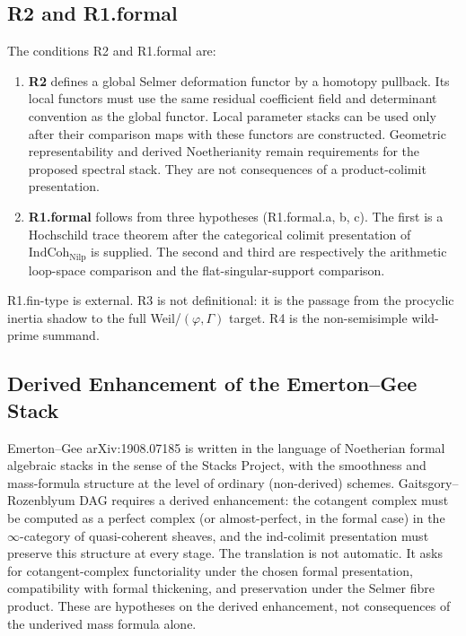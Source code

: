 \subsection{R2 and R1.formal}

The conditions R2 and R1.formal are:
\begin{enumerate}
\item \textbf{R2} defines a global Selmer deformation functor
by a homotopy pullback. Its local functors must use the same residual
coefficient field and determinant convention as the global functor.
Local parameter stacks can be used only after their comparison maps
with these functors are constructed. Geometric representability and
derived Noetherianity remain requirements for the proposed spectral
stack. They are not consequences of a product-colimit presentation.
\item \textbf{R1.formal} follows from three hypotheses
(R1.formal.a, b, c). The first is a Hochschild trace theorem after
the categorical colimit presentation of
\(\mathrm{IndCoh}_{\mathrm{Nilp}}\) is supplied. The second and third
are respectively the arithmetic loop-space comparison and the
flat-singular-support comparison.
\end{enumerate}

R1.fin-type is external. R3 is not definitional: it is the passage
from the procyclic inertia shadow to the full
Weil/\((\varphi,\Gamma)\) target. R4 is the non-semisimple wild-prime
summand.

\subsection{Derived Enhancement of the Emerton--Gee Stack}

Emerton--Gee arXiv:1908.07185 is written in the language of
Noetherian formal algebraic stacks in the sense of the
Stacks Project, with the smoothness and mass-formula structure at
the level of ordinary (non-derived) schemes. Gaitsgory--Rozenblyum
DAG requires a derived enhancement: the cotangent complex must be
computed as a perfect complex (or almost-perfect, in the formal
case) in the \(\infty\)-category of quasi-coherent sheaves, and the
ind-colimit presentation must preserve this structure at every
stage. The translation is not automatic. It asks for
cotangent-complex functoriality under the chosen formal presentation,
compatibility with formal thickening, and preservation under the
Selmer fibre product. These are hypotheses on the derived
enhancement, not consequences of the underived mass formula alone.

